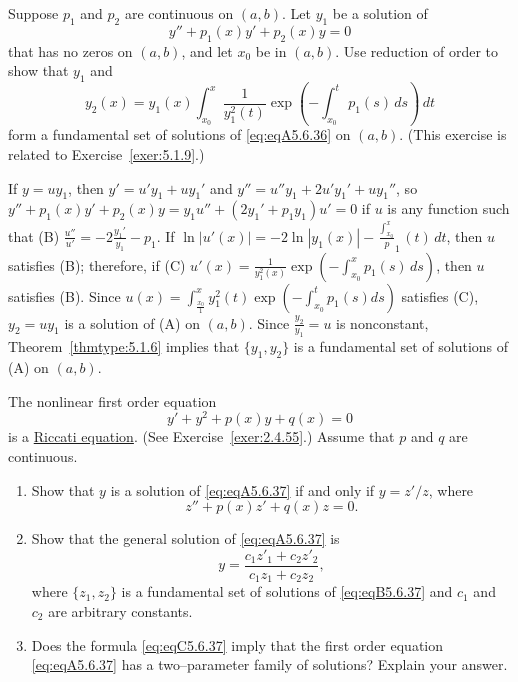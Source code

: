 \documentclass{ximera}
\begin{document}
\begin{problem}\label{exer:5.6.36}
Suppose $p_1$ and $p_2$ are continuous on $(a,b)$. Let $y_1$
be a solution of
\begin{equation}\label{eq:eqA5.6.36}
 y''+p_1(x)y'+p_2(x)y=0
\end{equation}
that has no zeros on $(a,b)$, and let $x_0$ be in $(a,b)$.
Use reduction of order to show that $y_1$ and
$$
y_2(x)=y_1(x)\int^x_{x_0}\frac{1}{y^2_1(t)} \exp
\left(-\int^t_{x_0}p_1(s)\, ds\right)\,dt
$$
form a fundamental set of solutions of \ref{eq:eqA5.6.36} on
$(a,b)$.
(This exercise is related to Exercise~\ref{exer:5.1.9}.)

\begin{solution}
    If $y=uy_1$, then $y'=u'y_1+uy_1'$  and $y''=u''y_1+2u'y_1'+uy_1''$,
so  $y''+p_1(x)y'+p_2(x)y=y_1u''+(2y_1'+p_1y_1)u'=0$ if $u$
is any function such that
(B) $\frac{u''}{ u'}=-2\frac{y_1'}{ y_1}-p_1$. If
 $\ln|u'(x)|=-2\ln|y_1(x)|-\frac{\int_{x_0}^x} p_1(t)\,dt$,
then $u$ satisfies (B); therefore, if
(C) $u'(x)=\frac{1}{ y_1^2(x)}\exp\left(-\int_{x_0}^x
p_1(s)\,ds\right)$, then $u$ satisfies (B).
Since $u(x)=\int^x_\frac{x_0}{1}{ y^2_1(t)} \exp
\left(-\int^t_{x_0}p_1(s) ds\right)$ satisfies (C), $y_2=uy_1$ is a
solution of (A) on $(a,b)$. Since $\frac{y_2}{ y_1}=u$ is
nonconstant, Theorem~\ref{thmtype:5.1.6} implies that $\{y_1,y_2\}$ is a
fundamental set of solutions of (A) on $(a,b)$.
\end{solution}
\end{problem}

\begin{problem}\label{exer:5.6.37}
The nonlinear first order equation
\begin{equation}\label{eq:eqA5.6.37}
y'+y^2+p(x)y+q(x)=0
\end{equation}
is a
\href{http://http://www-history.mcs.st-and.ac.uk/Indexes/Riccati.html}
{Riccati equation}.  (See
Exercise~\ref{exer:2.4.55}.) Assume that $p$ and $q$ are continuous.
\begin{enumerate}
\item %
Show that $y$ is a solution of \ref{eq:eqA5.6.37} if and only if $y={z'/z}$, where
\begin{equation}\label{eq:eqB5.6.37}
z''+p(x)z'+q(x)z=0.
\end{equation}

\item %
 Show that the general solution of \ref{eq:eqA5.6.37} is
\begin{equation}\label{eq:eqC5.6.37}
y=\frac{c_1z'_1+c_2z'_2}{c_1z_1+c_2z_2},
\end{equation}
where $\{z_1,z_2\}$ is a fundamental
set of solutions of \ref{eq:eqB5.6.37} and $c_1$ and $c_2$ are
arbitrary constants.

\item %
Does the formula \ref{eq:eqC5.6.37} imply that the first order equation
\ref{eq:eqA5.6.37} has a two--parameter family of solutions?
Explain your answer.
\end{enumerate}
\end{problem}
\end{document}
